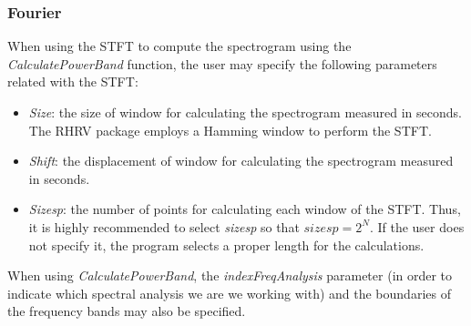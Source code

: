 \documentclass[12pt,lot, lof]{puthesis}
\begin{document}
\subsubsection{Fourier} When using the \gls{STFT} to compute the spectrogram 
using the \textit{CalculatePowerBand} function, the user may specify the 
following parameters related with the \gls{STFT}:
\begin{itemize}
\item \textit{Size}: the size of window for calculating the spectrogram 
measured in seconds. The RHRV package employs a Hamming window to perform the 
\gls{STFT}.
\item \textit{Shift}: the displacement of window for calculating the 
spectrogram measured in seconds.
\item \textit{Sizesp}: the number of points for calculating each window of the 
\gls{STFT}. Thus, it is highly recommended to select \textit{sizesp} so that 
$sizesp=2^N$. If the user does not specify it, the program selects a proper
length for the calculations.
\end{itemize}
When using \textit{CalculatePowerBand}, the \textit{indexFreqAnalysis} 
parameter (in order to indicate which spectral analysis we are we working with) 
and the boundaries of the frequency bands may also be specified.\\
\end{document}
